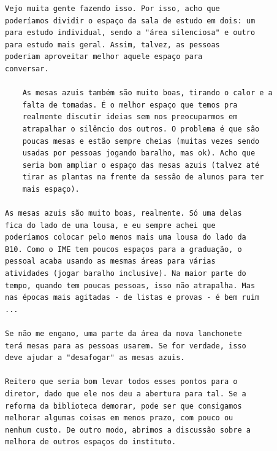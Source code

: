 \documentclass[titlepage]{article}
\begin{document}
\begin{lstlisting}[caption=Enviado por Renato Cordeiro]
Vejo muita gente fazendo isso. Por isso, acho que 
poderíamos dividir o espaço da sala de estudo em dois: um 
para estudo individual, sendo a "área silenciosa" e outro 
para estudo mais geral. Assim, talvez, as pessoas 
poderiam aproveitar melhor aquele espaço para 
conversar.

    As mesas azuis também são muito boas, tirando o calor e a 
    falta de tomadas. É o melhor espaço que temos pra 
    realmente discutir ideias sem nos preocuparmos em 
    atrapalhar o silêncio dos outros. O problema é que são 
    poucas mesas e estão sempre cheias (muitas vezes sendo 
    usadas por pessoas jogando baralho, mas ok). Acho que 
    seria bom ampliar o espaço das mesas azuis (talvez até 
    tirar as plantas na frente da sessão de alunos para ter 
    mais espaço).

As mesas azuis são muito boas, realmente. Só uma delas 
fica do lado de uma lousa, e eu sempre achei que 
poderíamos colocar pelo menos mais uma lousa do lado da 
B10. Como o IME tem poucos espaços para a graduação, o 
pessoal acaba usando as mesmas áreas para várias 
atividades (jogar baralho inclusive). Na maior parte do 
tempo, quando tem poucas pessoas, isso não atrapalha. Mas 
nas épocas mais agitadas - de listas e provas - é bem ruim
...

Se não me engano, uma parte da área da nova lanchonete 
terá mesas para as pessoas usarem. Se for verdade, isso 
deve ajudar a "desafogar" as mesas azuis.

Reitero que seria bom levar todos esses pontos para o 
diretor, dado que ele nos deu a abertura para tal. Se a 
reforma da biblioteca demorar, pode ser que consigamos 
melhorar algumas coisas em menos prazo, com pouco ou 
nenhum custo. De outro modo, abrimos a discussão sobre a 
melhora de outros espaços do instituto.
\end{lstlisting}
\end{document}
